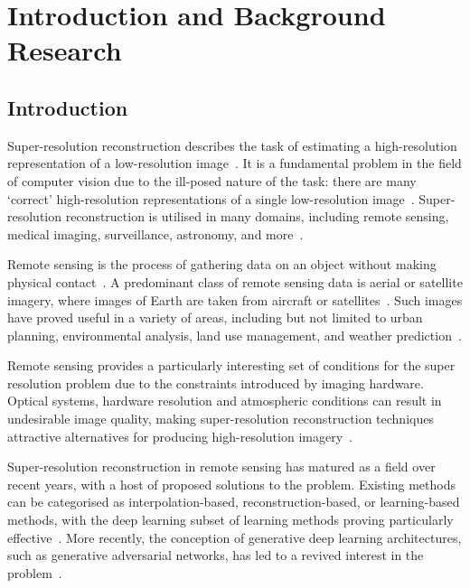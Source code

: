 \chapter{Introduction and Background Research}\label{chapter1}
\section{Introduction}

Super-resolution reconstruction describes the task of estimating a high-resolution representation of a low-resolution image~\cite{superResOverview}. It is a fundamental problem in the field of computer vision due to the ill-posed nature of the task: there are many `correct' high-resolution representations of a single low-resolution image~\cite{superResChallenges,superResRemoteSensingOverview}. Super-resolution reconstruction is utilised in many domains, including remote sensing, medical imaging, surveillance, astronomy, and more~\cite{superResRemoteSensingChallenges, superResRemoteSensingOverview, superResMedicalImaging, superResSurveillance, superResAstronomy, superResUses}.

Remote sensing is the process of gathering data on an object without making physical contact~\cite{remoteSensing}. A predominant class of remote sensing data is aerial or satellite imagery, where images of Earth are taken from aircraft or satellites~\cite{remoteSensing,remoteSensingImageProcessing}. Such images have proved useful in a variety of areas, including but not limited to urban planning, environmental analysis, land use management, and weather prediction~\cite{remoteSensingUses,remoteSensingGANsReview}.

Remote sensing provides a particularly interesting set of conditions for the super resolution problem due to the constraints introduced by imaging hardware. Optical systems, hardware resolution and atmospheric conditions can result in undesirable image quality, making super-resolution reconstruction techniques attractive alternatives for producing high-resolution imagery~\cite{superResRemoteSensingOverview,superResRemoteSensingChallenges, remoteSensingDeepLearningReview, remoteSensingGANsReview}.

Super-resolution reconstruction in remote sensing has matured as a field over recent years, with a host of proposed solutions to the problem. Existing methods can be categorised as interpolation-based, reconstruction-based, or learning-based methods, with the deep learning subset of learning methods proving particularly effective~\cite{superResRemoteSensingOverview,srcnn,vdsr}. More recently, the conception of generative deep learning architectures, such as generative adversarial networks, has led to a revived interest in the problem~\cite{srgan,esrgan,isrgan,tesagan,ndsrgan}.

